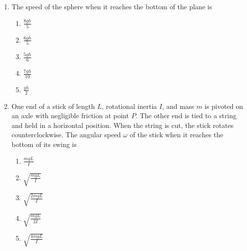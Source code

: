 \documentclass{../../../oss-apphys}
\begin{document}
\begin{multicols*}{2}
\begin{enumerate}[leftmargin=18pt,resume]
\begin{enumerate}[nosep,leftmargin=18pt,label=(\Alph*)]
    \item {}
      
    \item {}
    \end{enumerate}
    \label{hollow1}
    
  \item The speed of the sphere when it reaches the bottom of the plane is
    \begin{enumerate}[nosep,leftmargin=18pt,label=(\Alph*)]
    \item$\displaystyle\frac{8gh}5$
    \item$\displaystyle\frac{6gh}5$
    \item$\displaystyle\frac{5gh}6$
    \item$\displaystyle\frac{7gh}{10}$
    \item$\displaystyle\frac{gh}2$
    \end{enumerate}
    \label{hollow2}
    \columnbreak
    
  \item One end of a stick of length $L$, rotational inertia $I$, and mass $m$
    is pivoted on an axle with negligible friction at point $P$. The other end
    is tied to a string and held in a horizontal position. When the string is
    cut, the stick rotates counterclockwise. The angular speed $\omega$ of the
    stick when it reaches the bottom of its swing is
    \begin{enumerate}[nosep,leftmargin=18pt,label=(\Alph*)]
    \item$\displaystyle\frac{mgL}I$
    \item$\displaystyle\sqrt{\frac{mgL}I}$
    \item$\displaystyle\sqrt{\frac{2mgL}I}$
    \item$\displaystyle\sqrt{\frac{mgL}{2I}}$
    \item$\displaystyle\sqrt{\frac{4mgL}I}$
    \end{enumerate}
  \end{enumerate}
\end{multicols*}
\end{document}

